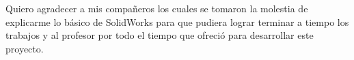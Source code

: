     Quiero agradecer a mis compañeros los cuales se tomaron la molestia de explicarme lo básico de SolidWorks para que pudiera lograr terminar a tiempo los trabajos y al profesor por todo el tiempo que ofreció para desarrollar este proyecto.
    
    
    

    \newpage
    
    
    \appendix
    \newpage
    \label{anexo:manualOperador}
    
